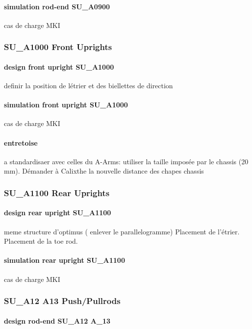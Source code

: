 			\paragraph{simulation rod-end SU\_A0900} cas de charge MKI

		\subsubsection*{SU\_A1000 Front Uprights} 
 \par 
			\paragraph{design front upright SU\_A1000} definir la position de létrier et des biellettes de direction 
			\paragraph{simulation front upright SU\_A1000} cas de charge MKI
			\paragraph{entretoise}  a standardisaer avec celles du A-Arms: utiliser la taille imposée par le chassis (20 mm). Démander à Calixthe la nouvelle distance des chapes chassis 
		\subsubsection*{SU\_A1100 Rear Uprights} 
 \par 
			\paragraph{design rear upright SU\_A1100} meme structure d'optimus ( enlever le parallelogramme) Placement de l'étrier. Placement de la toe rod.

			\paragraph{simulation rear upright SU\_A1100} cas de charge MKI
		\subsubsection*{SU\_A12 A13 Push/Pullrods} 
 \par 
			\paragraph{design rod-end SU\_A12 A\_13} 
